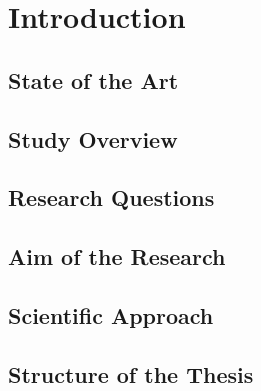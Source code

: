 
\chapter{Introduction}

\section{State of the Art}

\section{Study Overview}

\section{Research Questions}

\section{Aim of the Research}

\section{Scientific Approach}

\section{Structure of the Thesis}
